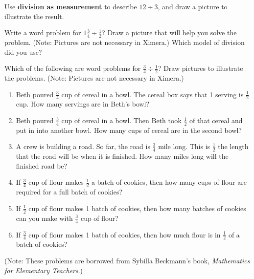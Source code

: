 \documentclass{ximera}
\begin{document}
\begin{problem}
Use \textbf{division as measurement} to describe $12\div 3$, and draw a picture to illustrate the result.  
\begin{freeResponse}
\end{freeResponse}
\end{problem}

\newpage

\begin{problem}
Write a word problem for $1 \frac{3}{4} \div \frac{1}{2}$?  Draw a picture that will help you solve the problem.  (Note: Pictures are not necessary in Ximera.)  Which model of division did you use?  
\begin{freeResponse}
\end{freeResponse}
\end{problem}


\newpage 
\begin{problem}
Which of the following are word problems for $\frac{3}{4} \div \frac{1}{2}$?  Draw pictures to illustrate the problems.  (Note: Pictures are not necessary in Ximera.)

\begin{enumerate}
\item Beth poured $\frac{3}{4}$ cup of cereal in a bowl.  The cereal box says that 1 serving is $\frac{1}{2}$ cup.  How many servings are in Beth's bowl? 

\item Beth poured $\frac{3}{4}$ cup of cereal in a bowl.  Then Beth took $\frac{1}{2}$ of that cereal and put in into another bowl.  How many cups of cereal are in the second bowl? 

\item A crew is building a road.  So far, the road is $\frac{3}{4}$ mile long.  This is $\frac{1}{2}$ the length that the road will be when it is finished.  How many miles long will the finished road be? 


\item If $\frac{3}{4}$ cup of flour makes $\frac{1}{2}$ a batch of cookies, then how many cups of flour are required for a full batch of cookies?  

\item If $\frac{1}{2}$ cup of flour makes 1 batch of cookies, then how many batches of cookies can you make with $\frac{3}{4}$ cup of flour?  

\item If $\frac{3}{4}$ cup of flour makes 1 batch of cookies, then how much flour is in $\frac{1}{2}$ of a batch of cookies? 

\end{enumerate}
(Note:  These problems are borrowed from Sybilla Beckmann's book, \emph{Mathematics for Elementary Teachers}.)
\begin{freeResponse}
\end{freeResponse}

\end{problem}
\end{document}
